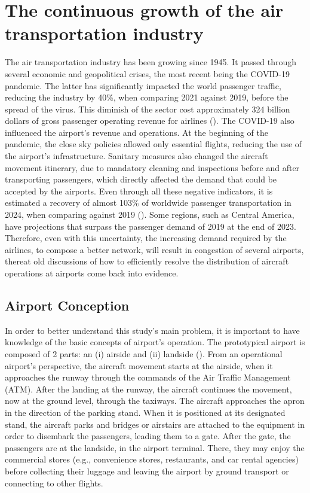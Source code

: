 
\label{section:Introduction}

\section{The continuous growth of the air transportation industry}%

The air transportation industry has been growing since 1945. It passed through several economic and geopolitical crises, the most recent being the COVID-19 pandemic. The latter has significantly impacted the world passenger traffic, reducing the industry by 40\%, when comparing 2021 against 2019, before the spread of the virus. This diminish of the sector cost approximately 324 billion dollars of gross passenger operating revenue for airlines (\citealp{ICAOEconomicImpact}). The COVID-19 also influenced the airport's revenue and operations. At the beginning of the pandemic, the close sky policies allowed only essential flights, reducing the use of the airport's infrastructure. Sanitary measures also changed the aircraft movement itinerary, due to mandatory cleaning and inspections before and after transporting passengers, which directly affected the demand that could be accepted by the airports. Even through all these negative indicators, it is estimated a recovery of almost 103\% of worldwide passenger transportation in 2024, when comparing against 2019 (\citealp{IATA2024}). Some regions, such as Central America, have projections that surpass the passenger demand of 2019 at the end of 2023. Therefore, even with this uncertainty, the increasing demand required by the airlines, to compose a better network, will result in congestion of several airports, thereat old discussions of how to efficiently resolve the distribution of aircraft operations at airports come back into evidence.

\subsection{Airport Conception}

In order to better understand this study's main problem, it is important to have knowledge of the basic concepts of airport’s operation. The prototypical airport is composed of 2 parts: an (i) airside and (ii) landside (\citealp{Lance2009}). From an operational airport’s perspective, the aircraft movement starts at the airside, when it approaches the runway through the commands of the Air Traffic Management (ATM). After the landing at the runway, the aircraft continues the movement, now at the ground level, through the taxiways. The aircraft approaches the apron in the direction of the parking stand. When it is positioned at its designated stand, the aircraft parks and bridges or airstairs are attached to the equipment in order to disembark the passengers, leading them to a gate. After the gate, the passengers are at the landside, in the airport terminal. There, they may enjoy the commercial stores (e.g., convenience stores, restaurants, and car rental agencies) before collecting their luggage and leaving the airport by ground transport or connecting to other flights. 


